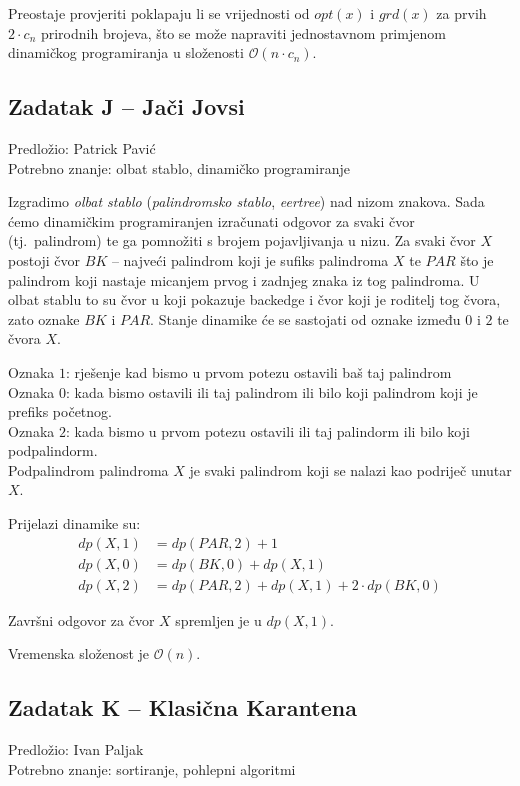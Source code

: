 \documentclass[a4paper]{article}
\begin{document}
Preostaje provjeriti poklapaju li se vrijednosti od $opt(x)$ i $grd(x)$ za
prvih $2 \cdot c_n$ prirodnih brojeva, što se može napraviti jednostavnom
primjenom dinamičkog programiranja u složenosti $\mathcal{O}(n \cdot c_n)$.

\subsection*{Zadatak J -- Jači Jovsi}
\textsf{Predložio: Patrick Pavić}\\
\textsf{Potrebno znanje: olbat stablo, dinamičko programiranje}

Izgradimo \textit{olbat stablo} (\textit{palindromsko stablo}, \textit{eertree})
nad nizom znakova. Sada ćemo dinamičkim programiranjen izračunati odgovor za
svaki čvor (tj.\ palindrom) te ga pomnožiti s brojem pojavljivanja u nizu.
Za svaki čvor $X$ postoji čvor $BK$ -- najveći palindrom koji je sufiks
palindroma $X$ te $PAR$ što je palindrom koji nastaje micanjem prvog i zadnjeg
znaka iz tog palindroma. U olbat stablu to su čvor u koji pokazuje backedge i
čvor koji je roditelj tog čvora, zato oznake $BK$ i $PAR$. Stanje dinamike će
se sastojati od oznake između $0$ i $2$ te čvora $X$.

Oznaka $1$: rješenje kad bismo u prvom potezu ostavili baš taj palindrom\\
Oznaka $0$: kada bismo ostavili ili taj palindrom ili bilo koji palindrom koji je prefiks početnog.\\
Oznaka $2$: kada bismo u prvom potezu ostavili ili taj palindorm ili bilo koji podpalindorm.\\

Podpalindrom palindroma $X$ je svaki palindrom koji se nalazi kao podriječ unutar $X$.

Prijelazi dinamike su:
\begin{align*}
  dp(X, 1) &= dp(PAR, 2) + 1 \\
  dp(X, 0) &= dp(BK, 0) + dp(X, 1) \\
  dp(X, 2) &= dp(PAR, 2) + dp(X, 1) + 2 \cdot dp(BK, 0)
\end{align*}

Završni odgovor za čvor $X$ spremljen je u $dp(X,1)$.

Vremenska složenost je $\mathcal{O}(n)$.

\subsection*{Zadatak K -- Klasična Karantena}
\textsf{Predložio: Ivan Paljak}\\
\textsf{Potrebno znanje: sortiranje, pohlepni algoritmi}
\end{document}
